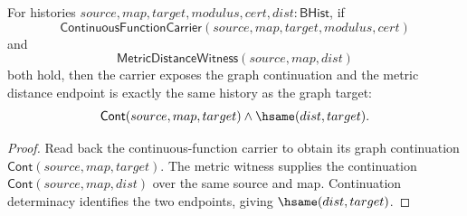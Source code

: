\begin{theorem}
\label{thm:continuousmap-function-carrier-metric-graph-exactness}
For histories $source,map,target,modulus,cert,dist:\mathsf{BHist}$, if
$$
\mathsf{ContinuousFunctionCarrier}(source,map,target,modulus,cert)
$$
and
$$
\mathsf{MetricDistanceWitness}(source,map,dist)
$$
both hold, then the carrier exposes the graph continuation and the metric
distance endpoint is exactly the same history as the graph target:
$$
\mathsf{Cont}(source,map,target)\land \hsame(dist,target).
$$
\end{theorem}
\begin{proof}
Read back the continuous-function carrier to obtain its graph continuation
$\mathsf{Cont}(source,map,target)$. The metric witness supplies the continuation
$\mathsf{Cont}(source,map,dist)$ over the same source and map. Continuation
determinacy identifies the two endpoints, giving $\hsame(dist,target)$.
\end{proof}
